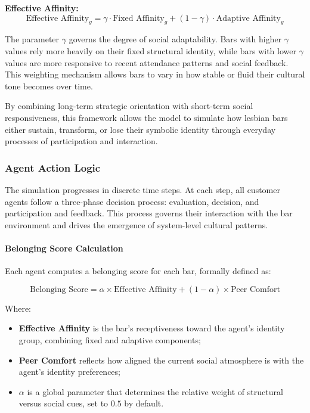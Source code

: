 \documentclass{article}
\begin{document}
\textbf{Effective Affinity:}
\[
\text{Effective Affinity}_g = \gamma \cdot \text{Fixed Affinity}_g + (1 - \gamma) \cdot \text{Adaptive Affinity}_g
\]

The parameter $\gamma$ governs the degree of social adaptability. Bars with higher $\gamma$ values rely more heavily on their fixed structural identity, while bars with lower $\gamma$ values are more responsive to recent attendance patterns and social feedback. This weighting mechanism allows bars to vary in how stable or fluid their cultural tone becomes over time.


By combining long-term strategic orientation with short-term social responsiveness, this framework allows the model to simulate how lesbian bars either sustain, transform, or lose their symbolic identity through everyday processes of participation and interaction.

\subsubsection{Agent Action Logic}

The simulation progresses in discrete time steps. At each step, all customer agents follow a three-phase decision process: evaluation, decision, and participation and feedback. This process governs their interaction with the bar environment and drives the emergence of system-level cultural patterns.

\paragraph{Belonging Score Calculation}

Each agent computes a belonging score for each bar, formally defined as:

\[
\text{Belonging Score} = \alpha \times \text{Effective Affinity} + (1 - \alpha) \times \text{Peer Comfort}
\]

Where:

\begin{itemize}
    \item \textbf{Effective Affinity} is the bar’s receptiveness toward the agent’s identity group, combining fixed and adaptive components;
    \item \textbf{Peer Comfort} reflects how aligned the current social atmosphere is with the agent’s identity preferences;
    \item $\alpha$ is a global parameter that determines the relative weight of structural versus social cues, set to $0.5$ by default.
\end{itemize}
\end{document}
